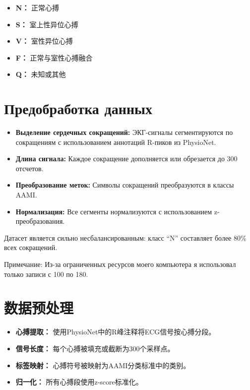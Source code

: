 \documentclass{article}
\providecommand{\pcsync}{\par\vspace{\baselineskip}}
\begin{document}
\begin{paracol}{2}
\begin{itemize}
    \item \textbf{N：} 正常心搏
    \item \textbf{S：} 室上性异位心搏
    \item \textbf{V：} 室性异位心搏
    \item \textbf{F：} 正常与室性心搏融合
    \item \textbf{Q：} 未知或其他
\end{itemize}

\switchcolumn*


\section{Предобработка данных}
\pcsync
\begin{itemize}
    \item \textbf{Выделение сердечных сокращений:} ЭКГ-сигналы сегментируются по сокращениям с использованием аннотаций R-пиков из PhysioNet.
    \item \textbf{Длина сигнала:} Каждое сокращение дополняется или обрезается до 300 отсчетов.
    \item \textbf{Преобразование меток:} Символы сокращений преобразуются в классы AAMI.
    \item \textbf{Нормализация:} Все сегменты нормализуются с использованием z-преобразования.
\end{itemize}

Датасет является сильно несбалансированным: класс ``N'' составляет более 80\% всех сокращений.

\pcsync
Примечание: Из-за ограниченных ресурсов моего компьютера я использовал только записи с 100 по 180.

\switchcolumn

\section{数据预处理}
\pcsync
\begin{itemize}
    \item \textbf{心搏提取：} 使用PhysioNet中的R峰注释将ECG信号按心搏分段。
    \item \textbf{信号长度：} 每个心搏被填充或截断为300个采样点。
    \item \textbf{标签映射：} 心搏符号被映射为AAMI分类标准中的类别。
    \item \textbf{归一化：} 所有心搏段使用z-score标准化。
\end{itemize}


\end{paracol}
\end{document}
